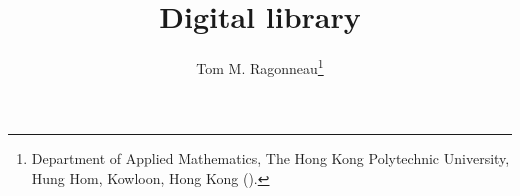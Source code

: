 \documentclass{article}
\title{Digital library}
\author{Tom M. Ragonneau\thanks{
    Department of Applied Mathematics,
    The Hong Kong Polytechnic University,
    Hung Hom, Kowloon, Hong Kong
    (\email{tom.ragonneau@polyu.edu.hk}).
}}
\date{\DTMnow}
\begin{document}
\maketitle

\nocite{*}


\end{document}
